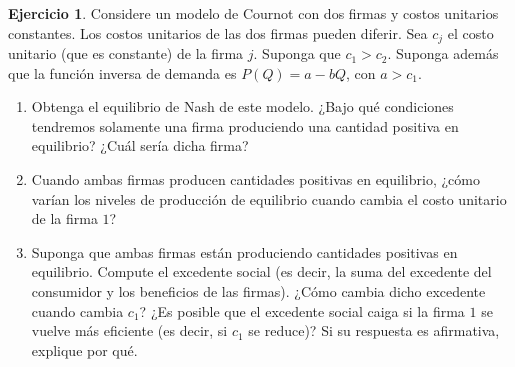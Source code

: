 \documentclass[a4paper, 11pt]{article}
\theoremstyle{definition}
\newtheorem{ejercicio}{Ejercicio}
\begin{document}
\begin{ejercicio} %
 Considere un modelo de Cournot con dos firmas y costos unitarios constantes. Los costos unitarios de las dos firmas pueden diferir. Sea $c_j$ el costo unitario (que es constante) de la firma $j$. Suponga que $c_1 > c_2$.
Suponga además que la función inversa de demanda es $P(Q) = a-bQ$, con $a > c_1$.

\begin{enumerate}[label=(\alph*)]
\item Obtenga el equilibrio de Nash de este modelo. ¿Bajo qué condiciones tendremos solamente una firma produciendo una cantidad positiva en equilibrio? ¿Cuál sería dicha firma?
\item Cuando ambas firmas producen cantidades positivas en equilibrio, ¿cómo varían los niveles de producción de equilibrio cuando cambia el costo unitario de la firma $1$?

\item  Suponga que ambas firmas están produciendo cantidades positivas en equilibrio. Compute el excedente social (es decir, la suma del excedente del consumidor y los beneficios de las firmas). ¿Cómo cambia
dicho excedente cuando cambia $c_1$? ¿Es posible que el excedente social caiga si la firma $1$ se vuelve más eficiente (es decir, si $c_1$ se
reduce)? Si su respuesta es afirmativa, explique por qué.
\end{enumerate}
\end{ejercicio}
\end{document}
